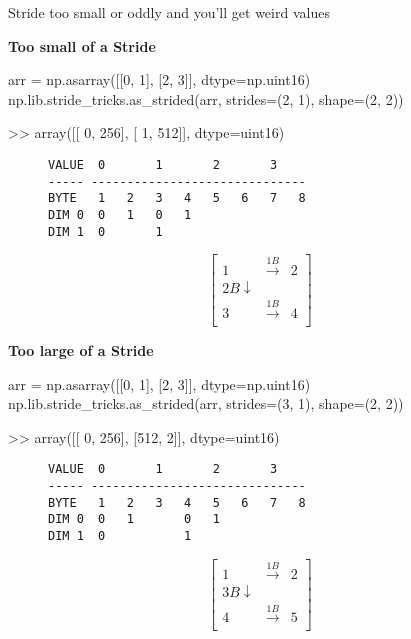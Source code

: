 \documentclass[oneside, 12pt]{report}
\begin{document}
Stride too small or oddly and you'll get weird values

\textbf{Too small of a Stride}
\begin{python}
arr = np.asarray([[0, 1], [2, 3]], dtype=np.uint16)
np.lib.stride_tricks.as_strided(arr, strides=(2, 1), shape=(2, 2))

>> array([[  0, 256],
          [  1, 512]], dtype=uint16)
\end{python}

\begin{figure}[H]
\begin{verbatim}
VALUE  0       1       2       3   
----- ------------------------------
BYTE   1   2   3   4   5   6   7   8
DIM 0  0   1   0   1   
DIM 1  0       1
\end{verbatim}
\end{figure}

\begin{figure}[H]
\begin{equation*}
\begin{bmatrix}
1 & \xrightarrow{1B} & 2 \\
2B \downarrow \\
3 & \xrightarrow{1B} & 4 \\
\end{bmatrix}
\end{equation*}
\end{figure}

\textbf{Too large of a Stride}
\begin{python}
arr = np.asarray([[0, 1], [2, 3]], dtype=np.uint16)
np.lib.stride_tricks.as_strided(arr, strides=(3, 1), shape=(2, 2))

>> array([[  0, 256],
          [512,   2]], dtype=uint16)
\end{python}

\begin{figure}[H]
\begin{verbatim}
VALUE  0       1       2       3   
----- ------------------------------
BYTE   1   2   3   4   5   6   7   8
DIM 0  0   1       0   1   
DIM 1  0           1
\end{verbatim}
\end{figure}

\begin{figure}[H]
\begin{equation*}
\begin{bmatrix}
1 & \xrightarrow{1B} & 2 \\
3B \downarrow \\
4 & \xrightarrow{1B} & 5 \\
\end{bmatrix}
\end{equation*}
\end{figure}
\end{document}
